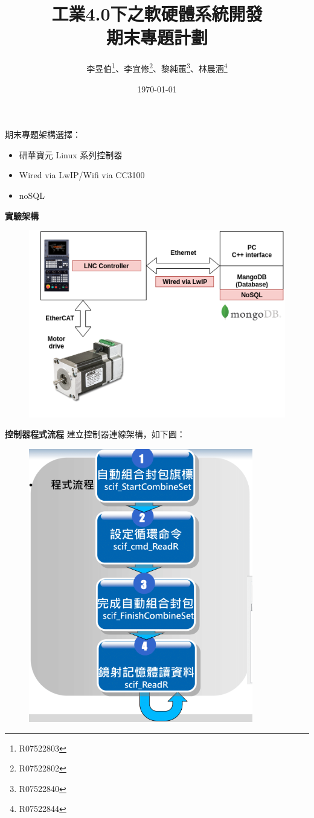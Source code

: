 \documentclass[12pt, a4paper]{article}
\date{\today}
\author{李昱伯\footnote{R07522803}、李宜修\footnote{R07522802}、黎純蕙\footnote{R07522840}、林晨涵\footnote{R07522844}}
\title{工業4.0下之軟硬體系統開發\\
期末專題計劃}
\begin{document}
\begin{CJK*}{UTF8}{bkai}
\maketitle

期末專題架構選擇：
\begin{itemize}
  \item 研華寶元 Linux 系列控制器
  \item Wired via LwIP/Wifi via CC3100
  \item noSQL
\end{itemize}

\textbf{實驗架構}
\begin{figure}[H]
  \centering
  \includegraphics[scale=0.7]{flow4.png}
\end{figure}

\newpage
\textbf{控制器程式流程}
建立控制器連線架構，如下圖：
\begin{figure}[H]
  \centering
  \includegraphics[scale=0.5]{controller.png}
\end{figure}


\end{CJK*}
\end{document}

